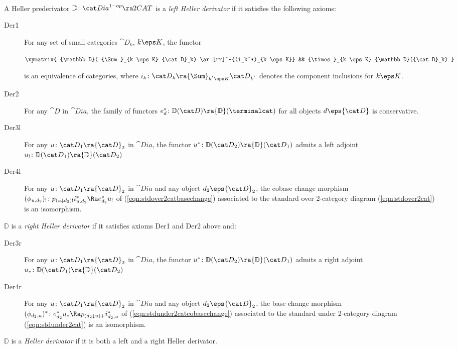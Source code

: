 \begin{defn}
\label{defn:hellerderivator}
\mbox{} \\
A Heller prederivator ${\mathbb D} \colon {\cat Dia}^{1-op} \ra  2CAT$ is a {\it left Heller derivator} if it satisfies the following axioms:
\begin{description}
\item[Der1]
For any set of small categories ${\cat D}_k$, $k \eps K$, the functor
\begin{center}
$\xymatrix {
    {\mathbb D}( {\Sum}_{k \eps K} {\cat D}_k) 
    \ar[rr]^-{(i_k^*)_{k \eps K}} &&
    {\times}_{k \eps K} {\mathbb D}({\cat D}_k)
  }$
\end{center}
is an equivalence of categories, where $i_{k} \colon {\cat D}_{k} \ra {\Sum}_{k^{'} \eps K} {\cat D}_{k^{'}}$ denotes the component inclusions for $k \eps K$.

\item[Der2]
For any ${\cat D}$ in ${\cat Dia}$, the family of functors $e_{d}^* \colon {\mathbb D}({\cat D}) \ra {\mathbb D}(\terminalcat)$ for all objects $d \eps {\cat D}$ is conservative.

\item[Der3l]
For any $u \colon {\cat D}_1 \ra {\cat D}_2$ in ${\cat Dia}$, the functor $u^* \colon {\mathbb D}({\cat D}_2) \ra {\mathbb D}({\cat D}_1)$ admits a left adjoint $u_! \colon {\mathbb D}({\cat D}_1) \ra {\mathbb D}({\cat D}_2)$

\item[Der4l]
For any $u \colon {\cat D}_1 \ra {\cat D}_2$ in ${\cat Dia}$ and any object $d_2 \eps {\cat D}_2$, the cobase change morphism $({\phi}_{u, d_2})_! \colon p_{(u \downarrow d_2)!}i_{u, d_2}^* \Ra e_{d_2}^*u_!$ of (\ref{eqn:stdover2catbasechange}) associated to the standard over 2-category diagram (\ref{eqn:stdover2cat}) is an isomorphism.
\end{description}

${\mathbb D}$ is a {\it right Heller derivator} if it satisfies axioms Der1 and Der2 above and:
\begin{description}
\item[Der3r]
For any $u \colon {\cat D}_1 \ra {\cat D}_2$ in ${\cat Dia}$, the functor $u^* \colon {\mathbb D}({\cat D}_2) \ra {\mathbb D}({\cat D}_1)$ admits a right adjoint $u_* \colon {\mathbb D}({\cat D}_1) \ra {\mathbb D}({\cat D}_2)$

\item[Der4r]
For any $u \colon {\cat D}_1 \ra {\cat D}_2$ in ${\cat Dia}$ and any object $d_2 \eps {\cat D}_2$, the base change morphism $({\phi}_{d_2, u})^* \colon e_{d_2}^*u_* \Ra p_{(d_2 \downarrow u)+}i_{d_2, u}^*$ of (\ref{eqn:stdunder2catcobasechange}) associated to the standard under 2-category diagram (\ref{eqn:stdunder2cat}) is an isomorphism.
\end{description}

${\mathbb D}$ is a {\it Heller derivator} if it is both a left and a right Heller derivator. 
\end{defn}

